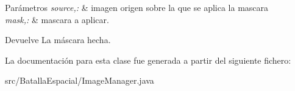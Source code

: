 \begin{DoxyParams}{Parámetros}
{\em source,:} & imagen origen sobre la que se aplica la mascara \\
\hline
{\em mask,:} & mascara a aplicar. \\
\hline
\end{DoxyParams}
\begin{DoxyReturn}{Devuelve}
La máscara hecha. 
\end{DoxyReturn}


La documentación para esta clase fue generada a partir del siguiente fichero:\begin{DoxyCompactItemize}
\item 
src/BatallaEspacial/ImageManager.java\end{DoxyCompactItemize}
